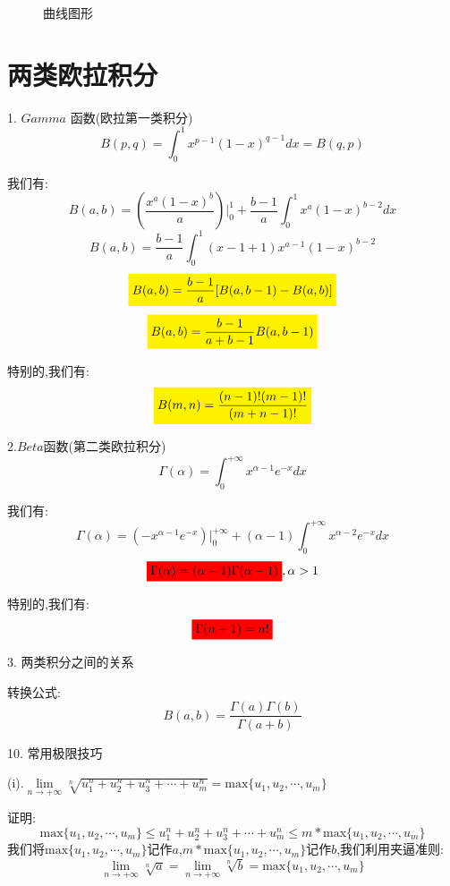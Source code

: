 \begin{figure}[H]
	\caption{曲线图形}
\end{figure}

\section{两类欧拉积分}

\begin{definition}	
	1. $Gamma$ 函数(欧拉第一类积分)
	$$B(p,q)=\int_{0}^{1}x^{p-1}(1-x)^{q-1}dx=B(q,p)$$
	
	我们有:  $$B(a,b)=(\frac{x^a(1-x)^b}{a})|_{0}^{1}+\frac{b-1}{a}\int_{0}^{1}x^{a}(1-x)^{b-2}dx$$
	$$B(a,b)=\frac{b-1}{a}\int_{0}^{1}(x-1+1)x^{a-1}(1-x)^{b-2}$$
	$$\mathcolorbox{yellow}{B(a,b)=\frac{b-1}{a}[B(a,b-1)-B(a,b)]}$$ $$\mathcolorbox{yellow}{B(a,b)=\frac{b-1}{a+b-1}B(a,b-1)}$$
	
	特别的,我们有:  $$\mathcolorbox{yellow}{B(m,n)=\frac{(n-1)!(m-1)!}{(m+n-1)!}}$$
	
	2.$Beta$函数(第二类欧拉积分)
	$$\Gamma(\alpha)=\int_{0}^{+\infty}x^{\alpha-1}e^{-x}dx$$
	
	我们有:  $$\Gamma(\alpha)=(-x^{\alpha-1}e^{-x})|_{0}^{+\infty}+(\alpha-1)\int_{0}^{+\infty}x^{\alpha-2}e^{-x}dx$$
	$$\mathcolorbox{red}{\Gamma(\alpha)=(\alpha-1)\Gamma(\alpha-1)},\alpha>1$$
	
	特别的,我们有:  $$\mathcolorbox{red}{\Gamma(n+1)=n!}$$
	
	3. 两类积分之间的关系
	
	转换公式:  
	$$B(a,b)=\frac{\Gamma(a)\Gamma(b)}{\Gamma(a+b)}$$
	
\end{definition}
10. 常用极限技巧
\begin{theorem}\label{the: 常用极限技巧}
	(i).$\lim\limits_{n\rightarrow +\infty}\sqrt[n]{u_{1}^{n}+u_{2}^{n}+u_{3}^{n}+\cdots+u_{m}^{n}}=\text{max}\{ u_{1},u_{2},\cdots,u_{m}\}$
	
	证明:  $$\text{max}\{ u_{1},u_{2},\cdots,u_{m}\}\leq u_{1}^{n}+u_{2}^{n}+u_{3}^{n}+\cdots+u_{m}^{n}\leq m*\text{max}\{ u_{1},u_{2},\cdots,u_{m}\}$$
	我们将$\text{max}\{ u_{1},u_{2},\cdots,u_{m}\}$记作$a$,$m*\text{max}\{ u_{1},u_{2},\cdots,u_{m}\}$记作$b$,我们利用夹逼准则:  
	$$\lim\limits_{n\rightarrow +\infty}\sqrt[n]{a}=\lim\limits_{n\rightarrow +\infty}\sqrt[n]{b}=\text{max}\{ u_{1},u_{2},\cdots,u_{m}\}$$
\end{theorem}
